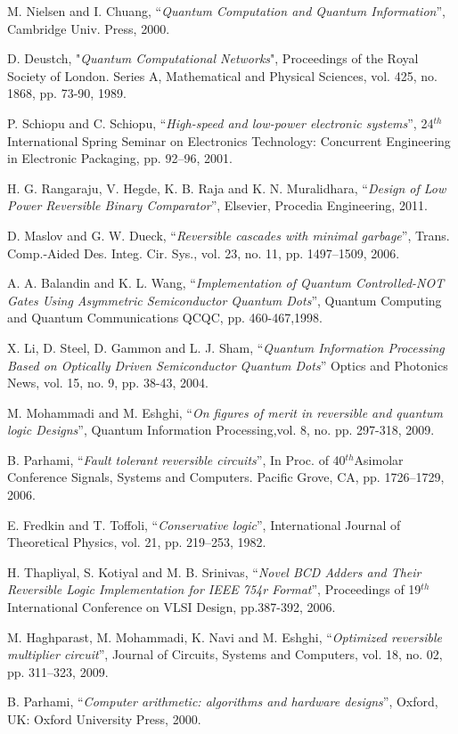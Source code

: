 	\noindent [13] M. Nielsen and I. Chuang, ``\textit{Quantum Computation and Quantum Information}'', Cambridge Univ. Press, 2000.
	
	\noindent [14] D. Deustch, "\textit{Quantum Computational Networks}", Proceedings of the Royal Society of London. Series A, Mathematical and Physical Sciences, vol. 425, no. 1868, pp. 73-90, 1989.
	
	\noindent [15] P. Schiopu and C. Schiopu, ``\textit{High-speed and low-power electronic systems}'', 24${}^{th}$International Spring Seminar on Electronics Technology: Concurrent Engineering in Electronic Packaging, pp. 92--96, 2001.
	
	\noindent [16] H. G. Rangaraju, V. Hegde, K. B. Raja and K. N. Muralidhara, ``\textit{Design of Low Power Reversible Binary Comparator}'', Elsevier, Procedia Engineering, 2011.
	
	\noindent [17] D. Maslov and G. W. Dueck, ``\textit{Reversible cascades with minimal garbage}'', Trans. Comp.-Aided Des. Integ. Cir. Sys., vol. 23, no. 11, pp. 1497--1509, 2006. 
	
	\noindent [18] A. A. Balandin and K. L. Wang, ``\textit{Implementation of Quantum Controlled-NOT Gates Using Asymmetric Semiconductor Quantum Dots}'', Quantum Computing and Quantum Communications QCQC, pp. 460-467,1998.
	
	\noindent [19] X. Li, D. Steel, D. Gammon and L. J. Sham, ``\textit{Quantum Information Processing Based on Optically Driven Semiconductor Quantum Dots}'' Optics and Photonics News, vol. 15, no. 9, pp. 38-43, 2004.
	
	\noindent [20] M. Mohammadi and M. Eshghi, ``\textit{On figures of merit in reversible and quantum logic Designs}'', Quantum Information Processing,vol. 8, no. pp. 297-318, 2009.
	
	\noindent [21] B. Parhami, ``\textit{Fault tolerant reversible circuits}'', In Proc. of 40${}^{th}$Asimolar Conference Signals, Systems and Computers. Pacific Grove, CA, pp. 1726--1729, 2006.
	
	\noindent [22] E. Fredkin and T. Toffoli, ``\textit{Conservative logic}'', International Journal of Theoretical Physics, vol. 21, pp. 219--253, 1982.
	
	\noindent [23] H. Thapliyal, S. Kotiyal and M. B. Srinivas, ``\textit{Novel BCD Adders and Their Reversible Logic Implementation for IEEE 754r Format}'', Proceedings of 19${}^{th}$International Conference on VLSI Design, pp.387-392, 2006.
	
	\noindent [24] M. Haghparast, M. Mohammadi, K. Navi and M. Eshghi, ``\textit{Optimized reversible multiplier circuit}'', Journal of Circuits, Systems and Computers, vol. 18, no. 02, pp. 311--323, 2009.
	
	\noindent [25]B. Parhami, ``\textit{Computer arithmetic: algorithms and hardware designs}'', Oxford, UK: Oxford University Press, 2000.